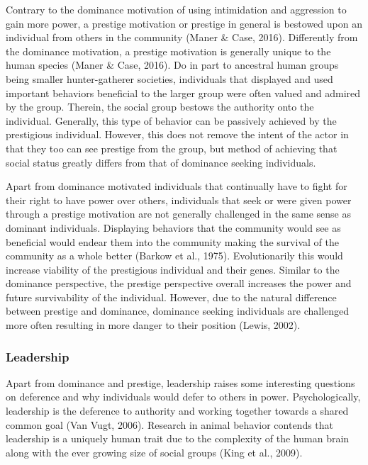 \documentclass[
  english,
  a4paper,floatsintext]{apa7}
\begin{document}
Contrary to the dominance motivation of using intimidation and aggression to gain more power, a prestige motivation or prestige in general is bestowed upon an individual from others in the community (Maner \& Case, 2016). Differently from the dominance motivation, a prestige motivation is generally unique to the human species (Maner \& Case, 2016). Do in part to ancestral human groups being smaller hunter-gatherer societies, individuals that displayed and used important behaviors beneficial to the larger group were often valued and admired by the group. Therein, the social group bestows the authority onto the individual. Generally, this type of behavior can be passively achieved by the prestigious individual. However, this does not remove the intent of the actor in that they too can see prestige from the group, but method of achieving that social status greatly differs from that of dominance seeking individuals.

Apart from dominance motivated individuals that continually have to fight for their right to have power over others, individuals that seek or were given power through a prestige motivation are not generally challenged in the same sense as dominant individuals. Displaying behaviors that the community would see as beneficial would endear them into the community making the survival of the community as a whole better (Barkow et al., 1975). Evolutionarily this would increase viability of the prestigious individual and their genes. Similar to the dominance perspective, the prestige perspective overall increases the power and future survivability of the individual. However, due to the natural difference between prestige and dominance, dominance seeking individuals are challenged more often resulting in more danger to their position (Lewis, 2002).

\hypertarget{leadership}{%
\subsubsection{Leadership}\label{leadership}}

Apart from dominance and prestige, leadership raises some interesting questions on deference and why individuals would defer to others in power. Psychologically, leadership is the deference to authority and working together towards a shared common goal (Van Vugt, 2006). Research in animal behavior contends that leadership is a uniquely human trait due to the complexity of the human brain along with the ever growing size of social groups (King et al., 2009).
\end{document}
